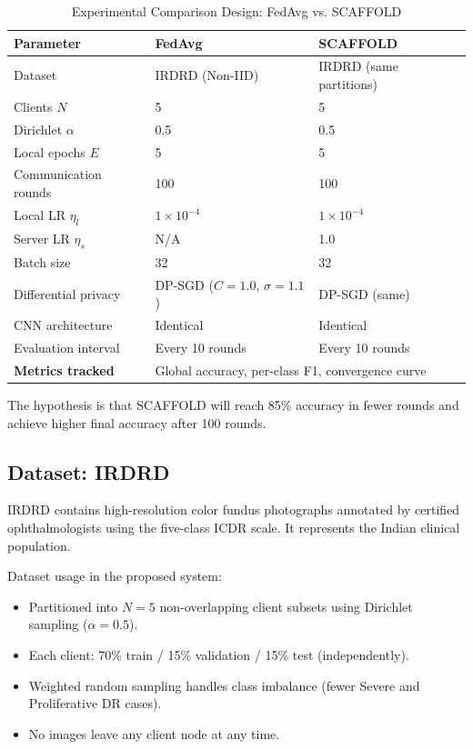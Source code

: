 \documentclass[12pt, a4paper]{article}
\begin{document}
\begin{table}[H]
\centering
\caption{Experimental Comparison Design: FedAvg vs. SCAFFOLD}
\label{tab:comparison}
\begin{tabular}{lll}
\toprule
\textbf{Parameter} & \textbf{FedAvg} & \textbf{SCAFFOLD} \\
\midrule
Dataset & IRDRD (Non-IID) & IRDRD (same partitions) \\
Clients $N$ & 5 & 5 \\
Dirichlet $\alpha$ & 0.5 & 0.5 \\
Local epochs $E$ & 5 & 5 \\
Communication rounds & 100 & 100 \\
Local LR $\eta_l$ & $1\times10^{-4}$ & $1\times10^{-4}$ \\
Server LR $\eta_s$ & N/A & 1.0 \\
Batch size & 32 & 32 \\
Differential privacy & DP-SGD ($C=1.0$, $\sigma=1.1$) & DP-SGD (same) \\
CNN architecture & Identical & Identical \\
Evaluation interval & Every 10 rounds & Every 10 rounds \\
\midrule
\textbf{Metrics tracked} & \multicolumn{2}{l}{Global accuracy, per-class F1, convergence curve} \\
\bottomrule
\end{tabular}
\end{table}

\noindent
The hypothesis is that SCAFFOLD will reach 85\% accuracy in fewer rounds and achieve higher final accuracy after 100 rounds.

\subsection{Dataset: IRDRD}

IRDRD contains high-resolution color fundus photographs annotated by certified ophthalmologists using the five-class ICDR scale. It represents the Indian clinical population.

Dataset usage in the proposed system:
\begin{itemize}
  \item Partitioned into $N = 5$ non-overlapping client subsets using Dirichlet sampling ($\alpha = 0.5$).
  \item Each client: 70\% train / 15\% validation / 15\% test (independently).
  \item Weighted random sampling handles class imbalance (fewer Severe and Proliferative DR cases).
  \item No images leave any client node at any time.
\end{itemize}
\end{document}
